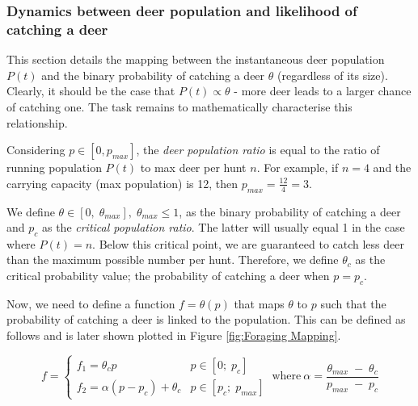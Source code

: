 \subsubsection{Dynamics between deer population and likelihood of catching a deer}

This section details the mapping between the instantaneous deer population $P(t)$ and the binary probability of catching a deer $\theta$ (regardless of its size). Clearly, it should be the case that $P(t) \propto \theta$ - more deer leads to a larger chance of catching one. The task remains to mathematically characterise this relationship. 

Considering $p \in [0,  p_{max}]$, the \textit{deer population ratio} is equal to the ratio of running population $P(t)$ to max deer per hunt $n$. For example, if $n=4$ and the carrying capacity (max population) is 12, then $p_{max} = \frac{12}{4} = 3$. 

We define $\theta \in [0, \; \theta_{max}], \; \theta_{max} \leq 1 $, as the binary probability of catching a deer and $p_c$ as the \textit{critical population ratio}. The latter will usually equal 1 in the case where $P(t) = n$. Below this critical point, we are guaranteed to catch less deer than the maximum possible number per hunt. Therefore, we define $\theta_c$ as the critical probability value; the probability of catching a deer when $p=p_c$.

Now, we need to define a function $f = \theta(p)$ that maps $\theta$ to $p$ such that the probability of catching a deer is linked to the population. This can be defined as follows and is later shown plotted in Figure \ref{fig:Foraging Mapping}.\newline

\begin{equation}
f=\begin{cases} 
      f_1 = \theta_c p & p \in [0; \; p_c] \\
      f_2 = \alpha(p-p_c) + \theta_c & p \in [p_c; \; p_{max}]
\end{cases}
\ \text{where} \ \alpha = \frac{\theta_{max}\; - \; \theta_c}{p_{max} \; - \; p_c}
\end{equation}
\newline

